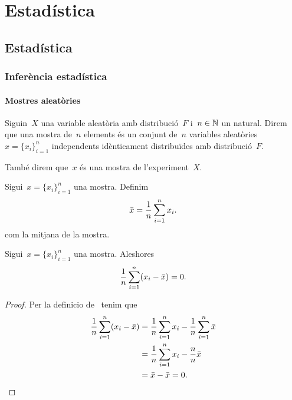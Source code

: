\documentclass[../Apunts.tex]{subfiles}
\begin{document}
\part{Estadística}
\chapter{Estadística}
\section{Inferència estadística}
\subsection{Mostres aleatòries}
\begin{definition}
	\label{def:mostra}
	Siguin~\(X\) una variable aleatòria amb distribució~\(F\) i~\(n\in\mathbb{N}\) un natural.
	Direm que una mostra de~\(n\) elements és un conjunt de~\(n\) variables aleatòries~\(x=\{x_{i}\}_{i=1}^{n}\) independents idènticament distribuïdes amb distribució~\(F\).

	També direm que~\(x\) és una mostra de l'experiment~\(X\).
\end{definition}
\begin{definition}[Mitjana]
	\label{def:mitjana}
	Sigui~\(x=\{x_{i}\}_{i=1}^{n}\) una mostra.
	Definim
	\begin{equation*}
		\bar{x}=\frac{1}{n}\sum_{i=1}^{n}x_{i}.
	\end{equation*}
	com la mitjana de la mostra.
\end{definition}
\begin{proposition}
	\label{prop:propietat mitjana}
	Sigui~\(x=\{x_{i}\}_{i=1}^{n}\) una mostra.
	Aleshores
	\begin{equation*}
		\frac{1}{n}\sum_{i=1}^{n}(x_{i}-\bar{x})=0.
	\end{equation*}
\end{proposition}
\begin{proof}
	Per la definicio de~ tenim que
	\begin{align*}
		\frac{1}{n}\sum_{i=1}^{n}(x_{i}-\bar{x}) &= \frac{1}{n}\sum_{i=1}^{n}x_{i}-\frac{1}{n}\sum_{i=1}^{n}\bar{x} \\
		&=\frac{1}{n}\sum_{i=1}^{n}x_{i}-\frac{n}{n}\bar{x} \\
		&=\bar{x}-\bar{x} = 0.\qedhere
	\end{align*}
\end{proof}
\end{document}

